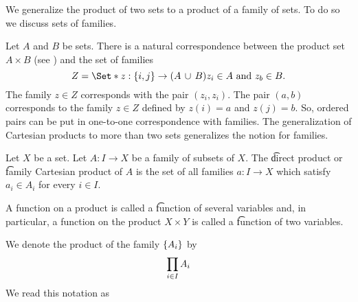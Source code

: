 

We generalize the product of two sets to a product of a family of sets.
To do so we discuss sets of families.


Let $A$ and $B$ be sets.
There is a natural correspondence between the product set $A \times B$ (see ) and the set of families
\[
  Z = \Set*{z: \set{i, j} \to (A \union B)}{z_i \in A \text{ and } z_b \in B}.
\]
The family $z \in Z$ corresponds with the pair $(z_i, z_i)$.
The pair $(a, b)$ corresponds to the family $z \in Z$ defined by $z(i) = a$ and $z(j) = b$.
So, ordered pairs can be put in one-to-one correspondence with families.
The generalization of Cartesian products to more than two sets generalizes the notion for families.


Let $X$ be a set.
Let $A: I \to X$ be a family of subsets of $X$.
The \t{direct product} or \t{family Cartesian product} of $A$ is the set of all families $a: I \to X$ which satisfy $a_i \in A_i$ for every $i \in I$.

A function on a product is called a \t{function of several variables} and, in particular, a function on the product $X \times Y$ is called a \t{function of two variables.}


We denote the product of the family $\{A_i\}$ by
\[
  \prod_{i \in I} A_i
\]
We read this notation as 
%

